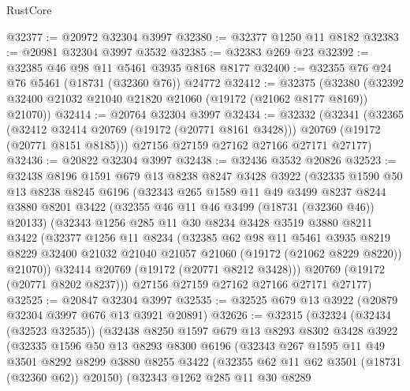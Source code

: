 \begin{lexlean}{RustCore}
\begin{coremodule}
@32377 := @20972 @32304 @3997
@32380 := @32377 @1250 @11 @8182
@32383 := @20981 @32304 @3997 @3532
@32385 := @32383 @269 @23
@32392 := @32385 @46 @98 @11 @5461 @3935 @8168 @8177
@32400 := @32355 @76 @24 @76 @5461 (@18731 (@32360 @76)) @24772
@32412 := @32375
    (@32380 (@32392 @32400 @21032 @21040 @21820 @21060 (@19172 (@21062 @8177 @8169)) @21070))
@32414 := @20764 @32304 @3997
@32434 := @32332
    (@32341
      (@32365
        (@32412 @32414 @20769 (@19172 (@20771 @8161 @3428)))
        @20769
        (@19172 (@20771 @8151 @8185)))
      @27156
      @27159
      @27162
      @27166
      @27171
      @27177)
@32436 := @20822 @32304 @3997
@32438 := @32436 @3532 @20826
@32523 := @32438
    @8196
    @1591
    @679
    @13
    @8238
    @8247
    @3428
    @3922
    (@32335
      @1590
      @50
      @13
      @8238
      @8245
      @6196
      (@32343
        @265
        @1589
        @11
        @49
        @3499
        @8237
        @8244
        @3880
        @8201
        @3422
        (@32355 @46 @11 @46 @3499 (@18731 (@32360 @46)) @20133)
        (@32343
          @1256
          @285
          @11
          @30
          @8234
          @3428
          @3519
          @3880
          @8211
          @3422
          (@32377
            @1256
            @11
            @8234
            (@32385
              @62
              @98
              @11
              @5461
              @3935
              @8219
              @8229
              @32400
              @21032
              @21040
              @21057
              @21060
              (@19172 (@21062 @8229 @8220))
              @21070))
          @32414
          @20769
          (@19172 (@20771 @8212 @3428)))
        @20769
        (@19172 (@20771 @8202 @8237)))
      @27156
      @27159
      @27162
      @27166
      @27171
      @27177)
@32525 := @20847 @32304 @3997
@32535 := @32525 @679 @13 @3922 (@20879 @32304 @3997 @676 @13 @3921 @20891)
@32626 := @32315
    (@32324
      (@32434 (@32523 @32535))
      (@32438
        @8250
        @1597
        @679
        @13
        @8293
        @8302
        @3428
        @3922
        (@32335
          @1596
          @50
          @13
          @8293
          @8300
          @6196
          (@32343
            @267
            @1595
            @11
            @49
            @3501
            @8292
            @8299
            @3880
            @8255
            @3422
            (@32355 @62 @11 @62 @3501 (@18731 (@32360 @62)) @20150)
            (@32343
              @1262
              @285
              @11
              @30
              @8289

\end{coremodule}
\end{lexlean}
